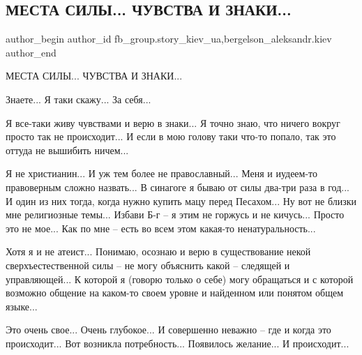  
 
 
 
 
 
\subsection{МЕСТА СИЛЫ... ЧУВСТВА И ЗНАКИ...}
\label{sec:11_01_2022.fb.fb_group.story_kiev_ua.1.mesta_sily}
 
\ifcmt
 author_begin
   author_id fb_group.story_kiev_ua,bergelson_aleksandr.kiev
 author_end
\fi

МЕСТА СИЛЫ... ЧУВСТВА И ЗНАКИ...

Знаете... Я таки скажу... За себя...

Я все-таки живу чувствами и верю в знаки... Я точно знаю, что ничего вокруг
просто так не происходит... И если в мою голову таки что-то попало, так это
оттуда не вышибить ничем...


Я не христианин... И уж тем более не православный... Меня и иудеем-то
правоверным сложно назвать... В синагоге я бываю от силы два-три раза в год... И
один из них тогда, когда нужно купить мацу перед Песахом... Ну вот не близки
мне религиозные темы... Избави Б-г – я этим не горжусь и не кичусь... Просто это
не мое... Как по мне – есть во всем этом какая-то ненатуральность... 

Хотя я и не атеист... Понимаю, осознаю и верю в существование некой
сверхъестественной силы – не могу объяснить какой – следящей и управляющей...
К которой я (говорю только о себе) могу обращаться и с которой возможно
общение на каком-то своем уровне и найденном или понятом  общем языке... 

Это очень свое... Очень глубокое... И совершенно неважно – где и когда это
происходит... Вот возникла потребность... Появилось желание... И происходит...



